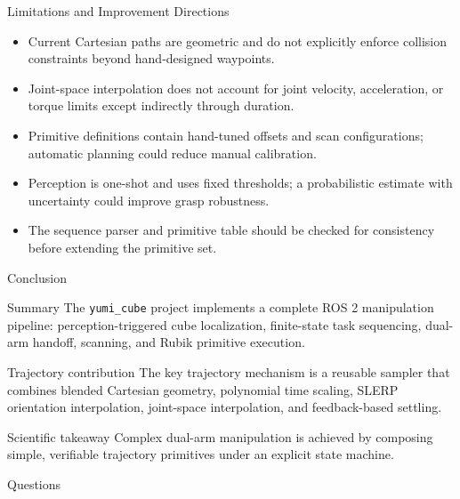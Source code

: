 \documentclass[10pt,aspectratio=169]{beamer}
\begin{document}
\begin{frame}{Limitations and Improvement Directions}
  \begin{itemize}
    \item Current Cartesian paths are geometric and do not explicitly enforce collision constraints beyond hand-designed waypoints.
    \item Joint-space interpolation does not account for joint velocity, acceleration, or torque limits except indirectly through duration.
    \item Primitive definitions contain hand-tuned offsets and scan configurations; automatic planning could reduce manual calibration.
    \item Perception is one-shot and uses fixed thresholds; a probabilistic estimate with uncertainty could improve grasp robustness.
    \item The sequence parser and primitive table should be checked for consistency before extending the primitive set.
  \end{itemize}
\end{frame}

\begin{frame}{Conclusion}
  \begin{block}{Summary}
    The \texttt{yumi\_cube} project implements a complete ROS 2 manipulation pipeline: perception-triggered cube localization, finite-state task sequencing, dual-arm handoff, scanning, and Rubik primitive execution.
  \end{block}

  \begin{block}{Trajectory contribution}
    The key trajectory mechanism is a reusable sampler that combines blended Cartesian geometry, polynomial time scaling, SLERP orientation interpolation, joint-space interpolation, and feedback-based settling.
  \end{block}

  \begin{block}{Scientific takeaway}
    Complex dual-arm manipulation is achieved by composing simple, verifiable trajectory primitives under an explicit state machine.
  \end{block}
\end{frame}

\begin{frame}
  \centering
  \Huge Questions
\end{frame}
\end{document}
